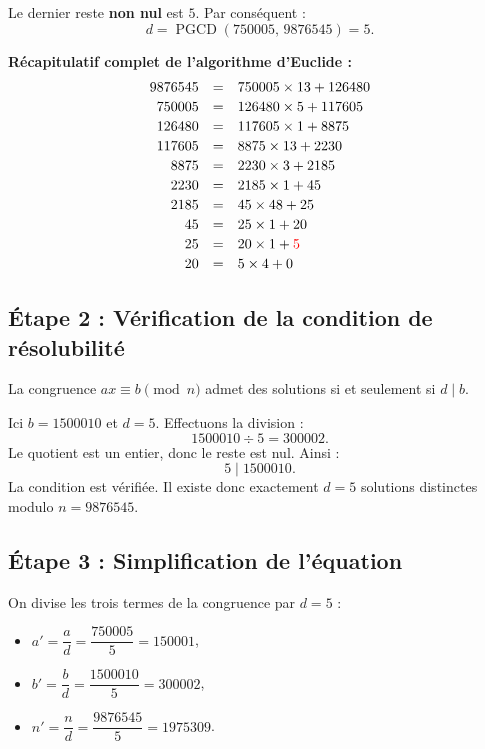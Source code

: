 \documentclass[12pt,a4paper]{article}
\begin{document}
\medskip
Le dernier reste \textbf{non nul} est $5$. Par conséquent :
\[
\boxed{d = \operatorname{PGCD}(750005,\,9876545) = 5}.
\]

\medskip
\textbf{Récapitulatif complet de l'algorithme d'Euclide :}
\[
\begin{array}{rcl}
9876545 &=& 750005 \times 13 + 126480 \\[2pt]
750005  &=& 126480 \times 5 + 117605 \\[2pt]
126480  &=& 117605 \times 1 + 8875 \\[2pt]
117605  &=& 8875 \times 13 + 2230 \\[2pt]
8875    &=& 2230 \times 3 + 2185 \\[2pt]
2230    &=& 2185 \times 1 + 45 \\[2pt]
2185    &=& 45 \times 48 + 25 \\[2pt]
45      &=& 25 \times 1 + 20 \\[2pt]
25      &=& 20 \times 1 + \textcolor{red}{5} \\[2pt]
20      &=& 5 \times 4 + 0
\end{array}
\]

\subsection*{Étape 2 : Vérification de la condition de résolubilité}

La congruence $ax \equiv b \pmod{n}$ admet des solutions si et seulement si $d \mid b$.

Ici $b = 1500010$ et $d = 5$. Effectuons la division :
\[
1500010 \div 5 = 300002.
\]
Le quotient est un entier, donc le reste est nul. Ainsi :
\[
\boxed{5 \mid 1500010}.
\]
La condition est vérifiée. Il existe donc exactement $d = 5$ solutions distinctes modulo $n = 9876545$.

\subsection*{Étape 3 : Simplification de l'équation}

On divise les trois termes de la congruence par $d = 5$ :

\begin{itemize}
    \item $a' = \dfrac{a}{d} = \dfrac{750005}{5} = 150001$,
    \item $b' = \dfrac{b}{d} = \dfrac{1500010}{5} = 300002$,
    \item $n' = \dfrac{n}{d} = \dfrac{9876545}{5} = 1975309$.
\end{itemize}
\end{document}
